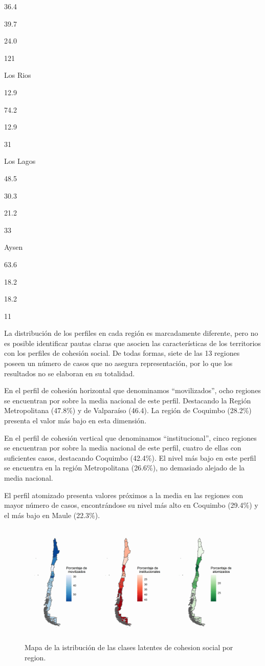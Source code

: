 \documentclass[
  12pt,
]{book}
\begin{document}
36.4

39.7

24.0

121

Los Rios

12.9

74.2

12.9

31

Los Lagos

48.5

30.3

21.2

33

Aysen

63.6

18.2

18.2

11

La distribución de los perfiles en cada región es marcadamente diferente, pero no es posible identificar pautas claras que asocien las características de los territorios con los perfiles de cohesión social. De todas formas, siete de las 13 regiones poseen un número de casos que no asegura representación, por lo que los resultados no se elaboran en su totalidad.

En el perfil de cohesión horizontal que denominamos ``movilizados'', ocho regiones se encuentran por sobre la media nacional de este perfil. Destacando la Región Metropolitana (47.8\%) y de Valparaíso (46.4). La región de Coquimbo (28.2\%) presenta el valor más bajo en esta dimensión.

En el perfil de cohesión vertical que denominamos ``institucional'', cinco regiones se encuentran por sobre la media nacional de este perfil, cuatro de ellas con suficientes casos, destacando Coquimbo (42.4\%). El nivel más bajo en este perfil se encuentra en la región Metropolitana (26.6\%), no demasiado alejado de la media nacional.

El perfil atomizado presenta valores próximos a la media en las regiones con mayor número de casos, encontrándose su nivel más alto en Coquimbo (29.4\%) y el más bajo en Maule (22.3\%).

\begin{figure}[H]

{\centering \includegraphics[width=1\linewidth,height=1\textheight]{output/graphs/mapas_region} 

}

\caption{Mapa de la istribución de las clases latentes de cohesion social por region.}\label{fig:mapas-region}
\end{figure}
\end{document}
